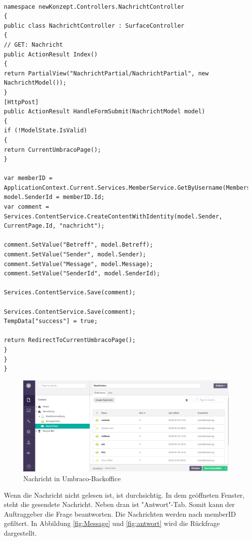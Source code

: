 \begin{lstlisting}[caption={NachrichController}, label=lst:NachrichController]

namespace newKonzept.Controllers.NachrichtController
{
public class NachrichtController : SurfaceController
{
// GET: Nachricht
public ActionResult Index()
{
return PartialView("NachrichtPartial/NachrichtPartial", new NachrichtModel());
}
[HttpPost]
public ActionResult HandleFormSubmit(NachrichtModel model)
{
if (!ModelState.IsValid)
{
return CurrentUmbracoPage();
}

var memberID = ApplicationContext.Current.Services.MemberService.GetByUsername(Membership.GetUser().UserName);
model.SenderId = memberID.Id;
var comment = Services.ContentService.CreateContentWithIdentity(model.Sender, CurrentPage.Id, "nachricht");

comment.SetValue("Betreff", model.Betreff);
comment.SetValue("Sender", model.Sender);
comment.SetValue("Message", model.Message);
comment.SetValue("SenderId", model.SenderId);

Services.ContentService.Save(comment);

Services.ContentService.Save(comment);
TempData["success"] = true;

return RedirectToCurrentUmbracoPage();
}
}
}
\end{lstlisting}


\begin{figure}[h]
	\centering
	\includegraphics[width=0.7\linewidth]{Graphics/NachrichtUmbraco.png}
	\caption[NachrichtUmbraco]{Nachricht in Umbraco-Backoffice}
	\label{fig:NachrichtUmbraco}
\end{figure}

Wenn die Nachricht nicht gelesen ist, ist durchsichtig. In dem geöffneten Fenster, steht die gesendete Nachricht. Neben dran ist "Antwort"-Tab. Somit kann der Auftraggeber die Frage beantworten. Die Nachrichten werden nach memberID gefiltert. In Abbildung \ref{fig:Message} und \ref{fig:antwort} wird die Rückfrage dargestellt.

